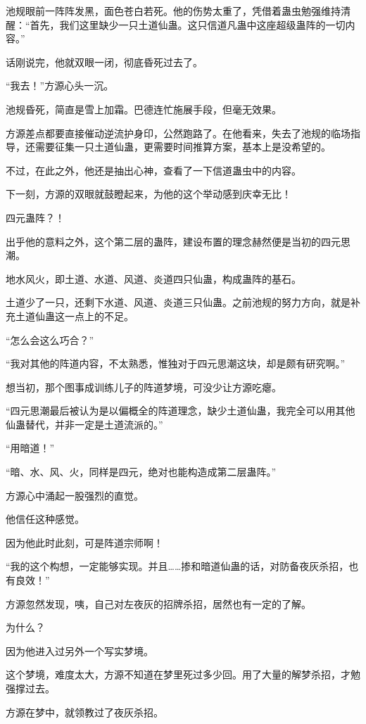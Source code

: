 \begin{this_body}
池规眼前一阵阵发黑，面色苍白若死。他的伤势太重了，凭借着蛊虫勉强维持清醒：“首先，我们这里缺少一只土道仙蛊。这只信道凡蛊中这座超级蛊阵的一切内容。”

话刚说完，他就双眼一闭，彻底昏死过去了。

“我去！”方源心头一沉。

池规昏死，简直是雪上加霜。巴德连忙施展手段，但毫无效果。

方源差点都要直接催动逆流护身印，公然跑路了。在他看来，失去了池规的临场指导，还需要征集一只土道仙蛊，更需要时间推算方案，基本上是没希望的。

不过，在此之外，他还是抽出心神，查看了一下信道蛊虫中的内容。

下一刻，方源的双眼就鼓瞪起来，为他的这个举动感到庆幸无比！

四元蛊阵？！

出乎他的意料之外，这个第二层的蛊阵，建设布置的理念赫然便是当初的四元思潮。

地水风火，即土道、水道、风道、炎道四只仙蛊，构成蛊阵的基石。

土道少了一只，还剩下水道、风道、炎道三只仙蛊。之前池规的努力方向，就是补充土道仙蛊这一点上的不足。

“怎么会这么巧合？”

“我对其他的阵道内容，不太熟悉，惟独对于四元思潮这块，却是颇有研究啊。”

想当初，那个图事成训练儿子的阵道梦境，可没少让方源吃瘪。

“四元思潮最后被认为是以偏概全的阵道理念，缺少土道仙蛊，我完全可以用其他仙蛊替代，并非一定是土道流派的。”

“用暗道！”

“暗、水、风、火，同样是四元，绝对也能构造成第二层蛊阵。”

方源心中涌起一股强烈的直觉。

他信任这种感觉。

因为他此时此刻，可是阵道宗师啊！

“我的这个构想，一定能够实现。并且……掺和暗道仙蛊的话，对防备夜灰杀招，也有良效！”

方源忽然发现，咦，自己对左夜灰的招牌杀招，居然也有一定的了解。

为什么？

因为他进入过另外一个写实梦境。

这个梦境，难度太大，方源不知道在梦里死过多少回。用了大量的解梦杀招，才勉强撑过去。

方源在梦中，就领教过了夜灰杀招。


\end{this_body}
